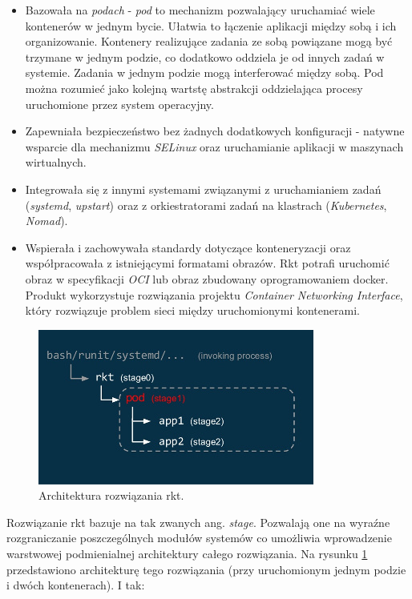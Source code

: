 \documentclass[10pt,a4paper,titlepage,twoside]{report}
\begin{document}
\begin{itemize}
\item Bazowała na \textit{podach} - \textit{pod} to mechanizm pozwalający uruchamiać wiele kontenerów w jednym bycie. Ułatwia to łączenie aplikacji między sobą i ich organizowanie. Kontenery realizujące zadania ze sobą powiązane mogą być trzymane w jednym podzie, co dodatkowo oddziela je od innych zadań w systemie. Zadania w jednym podzie mogą interferować między sobą. Pod można rozumieć jako kolejną wartstę abstrakcji oddzielająca procesy uruchomione przez system operacyjny.
\item Zapewniała bezpieczeństwo bez żadnych dodatkowych konfiguracji - natywne wsparcie dla mechanizmu \textit{SELinux} oraz uruchamianie aplikacji w maszynach wirtualnych.
\item Integrowała się z innymi systemami związanymi z uruchamianiem zadań (\textit{systemd}, \textit{upstart}) oraz z orkiestratorami zadań na klastrach (\textit{Kubernetes}, \textit{Nomad}).
\item Wspierała i zachowywała standardy dotyczące konteneryzacji oraz współpracowała z istniejącymi formatami obrazów. Rkt potrafi uruchomić obraz w specyfikacji \textit{OCI} lub obraz zbudowany oprogramowaniem docker. Produkt wykorzystuje rozwiązania projektu \textit{Container Networking Interface}, który rozwiązuje problem sieci między uruchomionymi kontenerami.
\end{itemize}

\begin{figure}[!h]
	\centering
	\includegraphics[scale=1]{pics/rkt-architecure.jpg}
	\caption{Architektura rozwiązania rkt.}
	\label{rkt_arch}
\end{figure}

Rozwiązanie rkt bazuje na tak zwanych ang. \textit{stage}. Pozwalają one na wyraźne rozgraniczanie poszczególnych modułów systemów co umożliwia wprowadzenie warstwowej podmienialnej architektury całego rozwiązania. Na rysunku \ref{rkt_arch} przedstawiono architekturę tego rozwiązania (przy uruchomionym jednym podzie i dwóch kontenerach). I tak:
\end{document}

